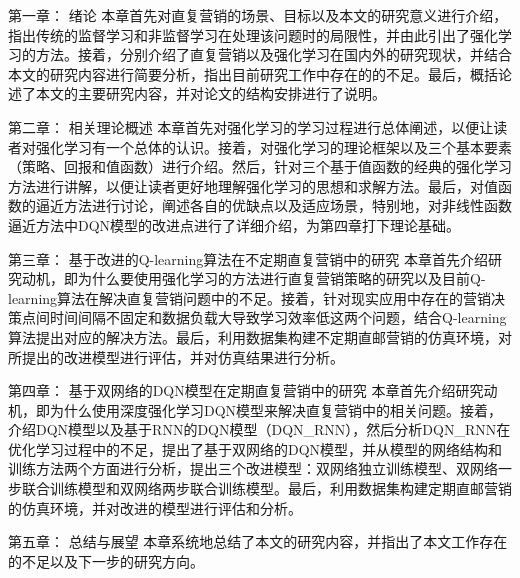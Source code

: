 第一章： 绪论 \quad 本章首先对直复营销的场景、目标以及本文的研究意义进行介绍，指出传统的监督学习和非监督学习在处理该问题时的局限性，并由此引出了强化学习的方法。接着，分别介绍了直复营销以及强化学习在国内外的研究现状，并结合本文的研究内容进行简要分析，指出目前研究工作中存在的的不足。最后，概括论述了本文的主要研究内容，并对论文的结构安排进行了说明。

第二章： 相关理论概述 \quad 本章首先对强化学习的学习过程进行总体阐述，以便让读者对强化学习有一个总体的认识。接着，对强化学习的理论框架以及三个基本要素（策略、回报和值函数）进行介绍。然后，针对三个基于值函数的经典的强化学习方法进行讲解，以便让读者更好地理解强化学习的思想和求解方法。最后，对值函数的逼近方法进行讨论，阐述各自的优缺点以及适应场景，特别地，对非线性函数逼近方法中DQN模型的改进点进行了详细介绍，为第四章打下理论基础。

第三章： 基于改进的Q-learning算法在不定期直复营销中的研究 \quad 本章首先介绍研究动机，即为什么要使用强化学习的方法进行直复营销策略的研究以及目前Q-learning算法在解决直复营销问题中的不足。接着，针对现实应用中存在的营销决策点间时间间隔不固定和数据负载大导致学习效率低这两个问题，结合Q-learning算法提出对应的解决方法。最后，利用数据集构建不定期直邮营销的仿真环境，对所提出的改进模型进行评估，并对仿真结果进行分析。

第四章： 基于双网络的DQN模型在定期直复营销中的研究 \quad 本章首先介绍研究动机，即为什么使用深度强化学习DQN模型来解决直复营销中的相关问题。接着，介绍DQN模型以及基于RNN的DQN模型（DQN_RNN），然后分析DQN_RNN在优化学习过程中的不足，提出了基于双网络的DQN模型，并从模型的网络结构和训练方法两个方面进行分析，提出三个改进模型：双网络独立训练模型、双网络一步联合训练模型和双网络两步联合训练模型。最后，利用数据集构建定期直邮营销的仿真环境，并对改进的模型进行评估和分析。

第五章： 总结与展望 \quad 本章系统地总结了本文的研究内容，并指出了本文工作存在的不足以及下一步的研究方向。


\cleardoublepage

